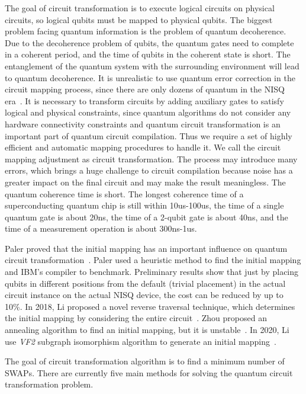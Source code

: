 \documentclass[runningheads]{llncs}
\begin{document}
The goal of circuit transformation is to execute logical circuits on physical circuits, so logical qubits must be mapped to physical qubits. The biggest problem facing quantum information is the problem of quantum decoherence. Due to the decoherence problem of qubits, the quantum gates need to complete in a coherent period, and the time of qubits in the coherent state is short. The entanglement of the quantum system with the surrounding environment will lead to quantum decoherence. It is unrealistic to use quantum error correction in the circuit mapping process, since there are only dozens of quantum in the NISQ era~\cite{2018QuantumPreskill}. It is necessary to transform circuits by adding auxiliary gates to satisfy logical and physical constraints, since quantum algorithms do not consider any hardware connectivity constraints and quantum circuit transformation is an important part of quantum circuit compilation. Thus we require a set of highly efficient and automatic mapping procedures to handle it. We call the circuit mapping adjustment as circuit transformation. The process may introduce many errors, which brings a huge challenge to circuit compilation because noise has a greater impact on the final circuit and may make the result meaningless. The quantum coherence time is short. The longest coherence time of a superconducting quantum chip is still within 10us-100us, the time of a single quantum gate is about 20ns, the time of a 2-qubit gate is about 40ns, and the time of a measurement operation is about 300ns-1us. 

Paler proved that the initial mapping has an important influence on quantum circuit transformation~\cite{Paler2018}. Paler used a heuristic method to find the initial mapping and IBM's compiler to benchmark. Preliminary results show that just by placing qubits in different positions from the default (trivial placement) in the actual circuit instance on the actual NISQ device, the cost can be reduced by up to 10\%. In 2018, Li proposed a novel reverse traversal technique, which determines the initial mapping by considering the entire circuit~\cite{Li2018}. Zhou proposed an annealing algorithm to find an initial mapping, but it is unstable~\cite{Xiangzhen2020}. In 2020, Li use \textit{VF2} subgraph isomorphism algorithm to generate an initial mapping~\cite{2020Qubit}.

The goal of circuit transformation algorithm is to find a minimum number of SWAPs. There are currently five main methods for solving the quantum circuit transformation problem.
\end{document}
